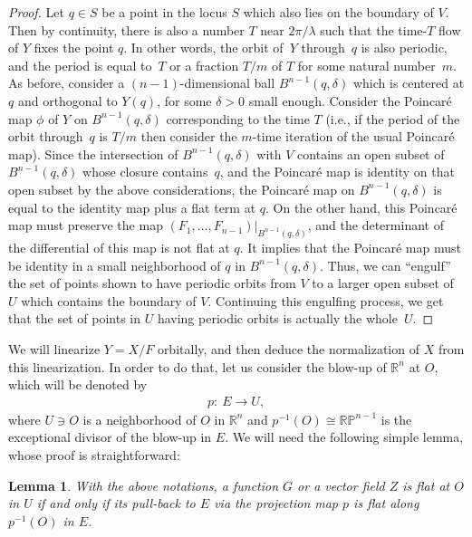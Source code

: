 \documentclass[11pt]{article}
\numberwithin{equation}{section}
\newtheorem{lem}[thm]{Lemma}
\newcommand{\bbR}{\mathbb R}
\newcommand{\bbP}{\mathbb P}
\begin{document}
\begin{proof}
Let $q \in S$ be a point in the locus $S$ which also lies on the boundary of $V$. Then by continuity, there is also
a number $T$ near $2\pi/\lambda$ such that the time-$T$ f\/low of $Y$ f\/ixes the point $q$. In other words, the orbit
of~$Y$ through~$q$ is also periodic, and the period is equal to~$T$ or a fraction $T/m$ of $T$ for some natural
number~$m$. As before, consider a $(n-1)$-dimensional
ball $B^{n-1}(q, \delta)$ which is centered at $q$ and orthogonal to $Y(q)$, for some $\delta > 0$ small enough.
Consider the Poincar\'e map $\phi$ of $Y$ on $B^{n-1}(q, \delta)$ corresponding to the time $T$ (i.e., if the period of the
orbit through~$q$ is $T/m$ then consider the $m$-time iteration of the usual Poincar\'e map). Since the intersection of
${B^{n-1}(q, \delta)}$ with $V$ contains an open subset of $B^{n-1}(q, \delta)$ whose closure contains~$q$, and
the Poincar\'e map is identity on that open subset by the above considerations, the Poincar\'e map on $B^{n-1}(q, \delta)$
is equal to the identity map plus a f\/lat term at $q$. On the other hand, this Poincar\'e map must preserve the
map $(F_1,\dots,F_{n-1})|_{B^{n-1}(q, \delta)}$, and the determinant of the dif\/ferential of this map is not f\/lat at $q$.
It implies that the Poincar\'e map must be identity in a small neighborhood of $q$ in ${B^{n-1}(q, \delta)}$. Thus, we can ``engulf'' the set of points shown to have periodic orbits from $V$ to a larger open subset of $U$ which contains the boundary of $V$. Continuing this
engulf\/ing process, we get that the set of points in $U$ having periodic orbits is actually the whole~$U$.
\end{proof}

 We will linearize $Y = X/F$ orbitally, and then deduce the normalization of $X$ from this linearization. In order to do that,
let us consider the blow-up of $\bbR^n$ at $O$, which will be denoted by
\begin{gather*}
 p\colon \ E \to U,
\end{gather*}
where $U \ni O$ is a neighborhood of $O$ in $\bbR^n$ and $p^{-1}(O) \cong \bbR \bbP^{n-1}$ is the exceptional
divisor of the blow-up in $E$. We will need the following simple lemma, whose proof is straightforward:

\begin{lem} \label{lem:blowup}
With the above notations, a function $G$ or a vector field $Z$ is flat at $O$ in $U$ if and only if its pull-back to
$E$ via the projection map $p$ is flat along $p^{-1}(O)$ in $E$.
\end{lem}
\end{document}
